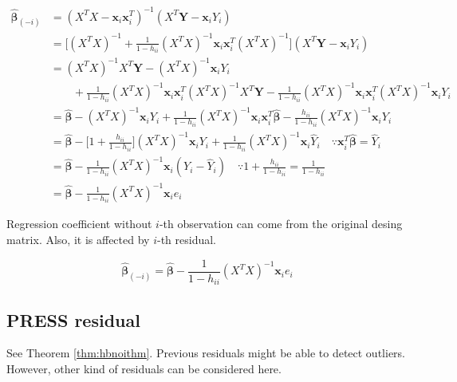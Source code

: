 \documentclass[]{book}
\theoremstyle{definition}
\theoremstyle{definition}
\theoremstyle{definition}
\theoremstyle{remark}
\let\BeginKnitrBlock\begin \let\EndKnitrBlock\end
\begin{document}
\begin{equation*}
  \begin{split}
    \boldsymbol{\hat\beta}_{(-i)} & = (X^TX - \mathbf{x}_i \mathbf{x}_i^T)^{-1} (X^T\mathbf{Y} - \mathbf{x}_i Y_i) \\
    & = \bigg[ (X^TX)^{-1} + \frac{1}{1 - h_{ii}} (X^TX)^{-1} \mathbf{x}_i \mathbf{x}_i^T (X^TX)^{-1} \bigg] (X^T\mathbf{Y} - \mathbf{x}_i Y_i) \\
    & = (X^TX)^{-1}X^T\mathbf{Y} - (X^TX)^{-1}\mathbf{x}_i Y_i \\
    & \qquad + \frac{1}{1 - h_{ii}} (X^TX)^{-1} \mathbf{x}_i \mathbf{x}_i^T (X^TX)^{-1} X^T \mathbf{Y} -  \frac{1}{1 - h_{ii}} (X^TX)^{-1} \mathbf{x}_i \mathbf{x}_i^T (X^TX)^{-1} \mathbf{x}_i Y_i \\
    & = \boldsymbol{\hat\beta}- (X^TX)^{-1}\mathbf{x}_i Y_i + \frac{1}{1 - h_{ii}} (X^TX)^{-1} \mathbf{x}_i \mathbf{x}_i^T \boldsymbol{\hat\beta}- \frac{h_{ii}}{1 - h_{ii}} (X^TX)^{-1} \mathbf{x}_i Y_i \\
    & = \boldsymbol{\hat\beta}- \bigg[ 1 + \frac{h_{ii}}{1 - h_{ii}} \bigg] (X^TX)^{-1} \mathbf{x}_i Y_i + \frac{1}{1 - h_{ii}} (X^TX)^{-1} \mathbf{x}_i \hat{Y}_i \quad \because \mathbf{x}_i^T \boldsymbol{\hat\beta}= \hat{Y}_i \\
    & = \boldsymbol{\hat\beta}- \frac{1}{1 - h_{ii}} (X^TX)^{-1} \mathbf{x}_i ( Y_i - \hat{Y}_i) \quad \because 1 + \frac{h_{ii}}{1 - h_{ii}} = \frac{1}{1 - h_{ii}} \\
    & = \boldsymbol{\hat\beta}- \frac{1}{1 - h_{ii}} (X^TX)^{-1} \mathbf{x}_i e_i
  \end{split}
\end{equation*}

\BeginKnitrBlock{theorem}
\protect\hypertarget{thm:hbnoithm}{}{\label{thm:hbnoithm} }Regression coefficient without \(i\)-th observation can come from the original desing matrix. Also, it is affected by \(i\)-th residual.

\[\boldsymbol{\hat\beta}_{(-i)} = \boldsymbol{\hat\beta}- \frac{1}{1 - h_{ii}} (X^TX)^{-1} \mathbf{x}_i e_i\]
\EndKnitrBlock{theorem}

\hypertarget{press-residual}{%
\subsection{PRESS residual}\label{press-residual}}

See Theorem \ref{thm:hbnoithm}. Previous residuals might be able to detect outliers. However, other kind of residuals can be considered here.
\end{document}
